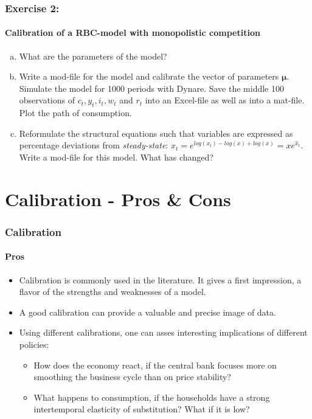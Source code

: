 \documentclass{beamer} %
\newcounter{saveenumi}
\newcommand{\conti}{\setcounter{enumi}{\value{saveenumi}}}
\begin{document}
\begin{frame}\frametitle{Exercise 2:}\framesubtitle{Calibration of a RBC-model with monopolistic competition}
\begin{enumerate}[(a)]\conti
   \item What are the parameters of the model?
   \item Write a mod-file for the model and calibrate the vector of
       parameters $\boldsymbol{\mu}$. Simulate the model for 1000 periods
       with Dynare. Save the middle 100 observations of $c_t, y_t, i_t,
       w_t$ and $r_t$ into an Excel-file as well as into a mat-file. Plot
       the path of consumption.
   \item Reformulate the structural equations such that variables are
       expressed as percentage deviations from \emph{steady-state}: $x_t=
       e^{log(x_t)-log(x)+log(x)}=x e^{\widehat{x}_t}$. Write a mod-file
       for this model. What has changed?
\end{enumerate}
\end{frame}

\section{Calibration - Pros \& Cons}
\begin{frame}\frametitle{Calibration}\framesubtitle{Pros}
\begin{itemize}
   \item Calibration is commonly used in the literature. It gives a first
       impression, a flavor of the strengths and weaknesses of a model.
   \item A good calibration can provide a valuable and precise image of
       data.
   \item Using different calibrations, one can asses interesting
       implications of different policies:
       \begin{itemize}
       \item How does the economy react, if the central bank focuses
           more on smoothing the business cycle than on price
           stability?
           \item What happens to consumption, if the households have
               a strong intertemporal elasticity of substitution?
               What if it is low?
       \end{itemize}
\end{itemize}
\end{frame}
\end{document}
